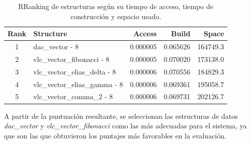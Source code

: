 \begin{table}[h!]
\centering
\caption[Comparación Estructuras de Datos Compactas]{RRanking de estructuras según su tiempo de acceso, tiempo de construcción y espacio usado.}
\label{tab:structure_ranking}
\begin{tabular}{|c|l|r|r|r|}
\hline
\textbf{Rank} & \textbf{Structure} & \textbf{Access} & \textbf{Build} & \textbf{Space} \\
\hline
1 & dac\_vector - 8 & 0.000005 & 0.065626 & 164749.3 \\
\hline
2 & vlc\_vector\_fibonacci - 8 & 0.000005 & 0.070020 & 173138.0 \\
\hline
3 & vlc\_vector\_elias\_delta - 8 & 0.000006 & 0.070556 & 184829.3 \\
\hline
4 & vlc\_vector\_elias\_gamma - 8 & 0.000006 & 0.069361 & 195058.7 \\
\hline
5 & vlc\_vector\_comma\_2 - 8 & 0.000006 & 0.069731 & 202126.7 \\
\hline
\end{tabular}
\end{table}


A partir de la puntuación resultante, se seleccionan las estructuras de datos \textit{dac\_vector} y \textit{vlc\_vector\_fibonacci} como las más adecuadas para el sistema, ya que son las que obtuvieron los puntajes más favorables en la evaluación.